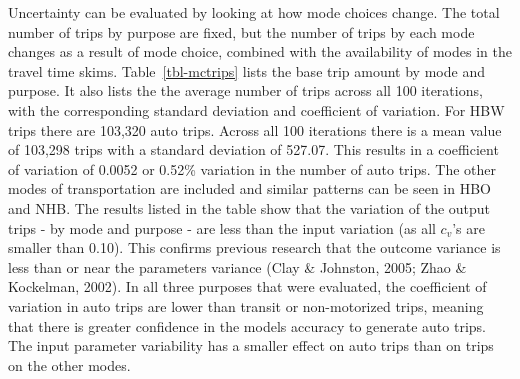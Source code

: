 \documentclass[
  letterpaper,
  authoryear,
  review,
  3p]{elsarticle}
\begin{document}
Uncertainty can be evaluated by looking at how mode choices change. The
total number of trips by purpose are fixed, but the number of trips by
each mode changes as a result of mode choice, combined with the
availability of modes in the travel time skims. Table~\ref{tbl-mctrips}
lists the base trip amount by mode and purpose. It also lists the the
average number of trips across all 100 iterations, with the
corresponding standard deviation and coefficient of variation. For HBW
trips there are 103,320 auto trips. Across all 100 iterations there is a
mean value of 103,298 trips with a standard deviation of 527.07. This
results in a coefficient of variation of 0.0052 or 0.52\% variation in
the number of auto trips. The other modes of transportation are included
and similar patterns can be seen in HBO and NHB. The results listed in
the table show that the variation of the output trips - by mode and
purpose - are less than the input variation (as all \(c_v\)'s are
smaller than 0.10). This confirms previous research that the outcome
variance is less than or near the parameters variance (Clay \& Johnston,
2005; Zhao \& Kockelman, 2002). In all three purposes that were
evaluated, the coefficient of variation in auto trips are lower than
transit or non-motorized trips, meaning that there is greater confidence
in the models accuracy to generate auto trips. The input parameter
variability has a smaller effect on auto trips than on trips on the
other modes.
\end{document}
